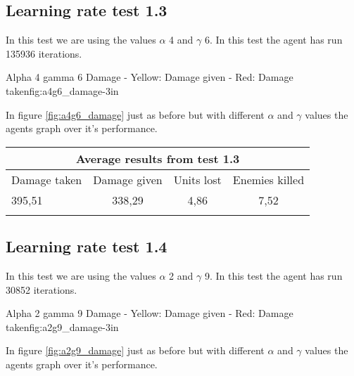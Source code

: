 \subsection*{Learning rate test 1.3}
In this test we are using the values $\alpha$ 4 and $\gamma$ 6. In this test the agent has run 135936 iterations.


			{Alpha 4 gamma 6 Damage - Yellow: Damage given - Red: Damage taken}{fig:a4g6_damage}{-3in}

In figure \ref{fig:a4g6_damage} just as before but with different $\alpha$ and $\gamma$ values the agents graph over it's performance.




\begin{centering}
 \begin{tabular}{|l||c|c|c|}
	\multicolumn{4}{c}{Average results from test 1.3} \\
	\hline
		Damage taken & Damage given & Units lost & Enemies killed\\
	\hline
		395,51 & 338,29 & 4,86 & 7,52 \\
	\hline
\label{test1.3}
\end{tabular}
\end{centering}




\subsection*{Learning rate test 1.4}
In this test we are using the values $\alpha$ 2 and $\gamma$ 9. In this test the agent has run 30852 iterations.


			{Alpha 2 gamma 9 Damage - Yellow: Damage given - Red: Damage taken}{fig:a2g9_damage}{-3in}

In figure \ref{fig:a2g9_damage} just as before but with different $\alpha$ and $\gamma$ values the agents graph over it's performance.




